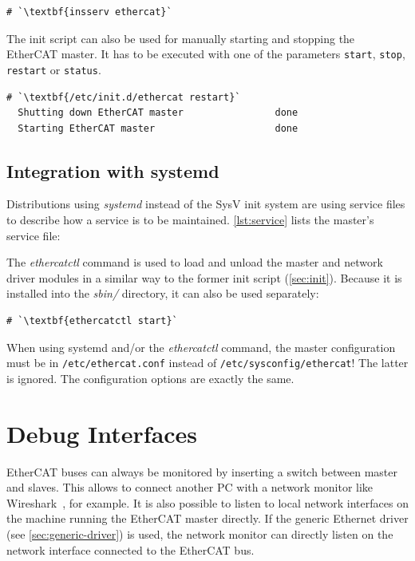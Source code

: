 \documentclass[a4paper,12pt,BCOR6mm,bibtotoc,idxtotoc]{scrbook}
\begin{document}
\begin{lstlisting}
# `\textbf{insserv ethercat}`
\end{lstlisting}

The init script can also be used for manually starting and stopping
the EtherCAT master. It has to be executed with one of the parameters
\texttt{start}, \texttt{stop}, \texttt{restart} or \texttt{status}.

\begin{lstlisting}[gobble=2]
  # `\textbf{/etc/init.d/ethercat restart}`
  Shutting down EtherCAT master                done
  Starting EtherCAT master                     done
\end{lstlisting}

\subsection{Integration with systemd}
\label{sec:systemd}

Distributions using \textit{systemd} instead of the SysV init system are using service files to describe how a service is to be maintained. \autoref{lst:service} lists the master's service file:



The \textit{ethercatctl} command is used to load and unload the master and
network driver modules in a similar way to the former init script
(\autoref{sec:init}). Because it is installed into the \textit{sbin/}
directory, it can also be used separately:

\begin{lstlisting}[gobble=2]
  # `\textbf{ethercatctl start}`
\end{lstlisting}

When using systemd and/or the \textit{ethercatctl} command, the master
configuration must be in \texttt{/etc/ethercat.conf} instead of
\texttt{/etc/sysconfig/ethercat}! The latter is ignored. The configuration
options are exactly the same.


\section{Debug Interfaces}
\label{sec:debug}

EtherCAT buses can always be monitored by inserting a switch between master
and slaves. This allows to connect another PC with a network monitor like
Wireshark~\cite{wireshark}, for example. It is also possible to listen to
local network interfaces on the machine running the EtherCAT master directly.
If the generic Ethernet driver (see \autoref{sec:generic-driver}) is used,
the network monitor can directly listen on the network interface connected to
the EtherCAT bus.
\end{document}
